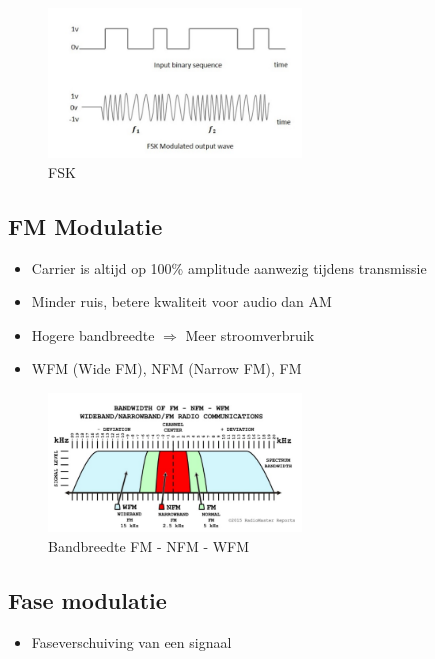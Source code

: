 \documentclass{article}
\begin{document}
\begin{figure}[H]
    \centering
    \includegraphics[width=0.6\textwidth]{Screenshot_20200302_121458.png}
    \caption{FSK}
\end{figure}

\subsection{FM Modulatie}
\begin{itemize}
    \item Carrier is altijd op 100\% amplitude aanwezig tijdens transmissie
    \item Minder ruis, betere kwaliteit voor audio dan AM
    \item Hogere bandbreedte $\Rightarrow$ Meer stroomverbruik
    \item WFM (Wide FM), NFM (Narrow FM), FM
\end{itemize}

\begin{figure}[H]
    \centering
    \includegraphics[width=0.6\textwidth]{Screenshot_20200302_121650.png}
    \caption{Bandbreedte FM - NFM - WFM}
\end{figure}

\subsection{Fase modulatie}
\begin{itemize}
    \item Faseverschuiving van een signaal
\end{itemize}
\end{document}
